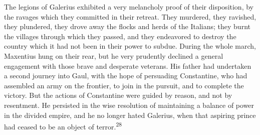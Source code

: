The legions of Galerius exhibited a very melancholy proof of
their disposition, by the ravages which they committed in their
retreat. They murdered, they ravished, they plundered, they drove
away the flocks and herds of the Italians; they burnt the
villages through which they passed, and they endeavored to
destroy the country which it had not been in their power to
subdue. During the whole march, Maxentius hung on their rear, but
he very prudently declined a general engagement with those brave
and desperate veterans. His father had undertaken a second
journey into Gaul, with the hope of persuading Constantine, who
had assembled an army on the frontier, to join in the pursuit,
and to complete the victory. But the actions of Constantine were
guided by reason, and not by resentment. He persisted in the wise
resolution of maintaining a balance of power in the divided
empire, and he no longer hated Galerius, when that aspiring
prince had ceased to be an object of terror.\textsuperscript{28}


